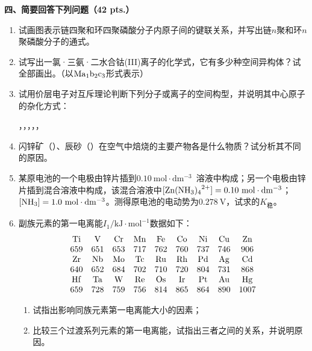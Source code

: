 \vspace{0.5cm}
\noindent\textbf{四、简要回答下列问题（42 pts.）}

\begin{enumerate}[label=\arabic*., start=1, itemsep=1.5ex]
    \item 试画图表示链四聚和环四聚磷酸分子内原子间的键联关系，并写出链$n$聚和环$n$聚磷酸分子的通式。
    \item 试写出一氯·三氨·二水合钴(III)离子的化学式，它有多少种空间异构体？试全部画出。（以$\ce{Ma1b2c3}$形式表示）
    \item 试用价层电子对互斥理论判断下列分子或离子的空间构型，并说明其中心原子的杂化方式：
    
    {\centering
    ，，，，， \par
    }
    \item 闪锌矿（）、辰砂（）在空气中焙烧的主要产物各是什么物质？试分析其不同的原因。
    \item 某原电池的一个电极由锌片插到$0.10\ \mathrm{mol\cdot dm^{-3}}$\ 溶液中构成；另一个电极由锌片插到混合溶液中构成，该混合溶液中$[\ce{Zn(NH3)4^{2+}}]=0.10\ \mathrm{mol\cdot dm^{-3}}$；$[\ce{NH3}]=1.0\ \mathrm{mol\cdot dm^{-3}}$。测得原电池的电动势为$0.278\ \mathrm{V}$，试求的$K_{\text{稳}}$。
    \item 副族元素的第一电离能$I_1/\mathrm{kJ\cdot mol^{-1}}$数据如下：
    \[
    \begin{array}{ccccccccc}
    \ce{Ti} & \ce{V} & \ce{Cr} & \ce{Mn} & \ce{Fe} & \ce{Co} & \ce{Ni} & \ce{Cu} & \ce{Zn} \\
    659 & 651 & 653 & 717 & 762 & 760 & 737 & 746 & 906 \\
    \ce{Zr} & \ce{Nb} & \ce{Mo} & \ce{Tc} & \ce{Ru} & \ce{Rh} & \ce{Pd} & \ce{Ag} & \ce{Cd} \\
    640 & 652 & 684 & 702 & 710 & 720 & 804 & 731 & 868 \\
    \ce{Hf} & \ce{Ta} & \ce{W} & \ce{Re} & \ce{Os} & \ce{Ir} & \ce{Pt} & \ce{Au} & \ce{Hg} \\
    659 & 728 & 759 & 756 & 814 & 865 & 864 & 890 & 1007 \\
    \end{array}
    \]
    \begin{enumerate}[label=(\alph*), itemsep=1ex]
        \item 试指出影响同族元素第一电离能大小的因素；
        \item 比较三个过渡系列元素的第一电离能，试指出三者之间的关系，并说明原因。
    \end{enumerate}
\end{enumerate}

